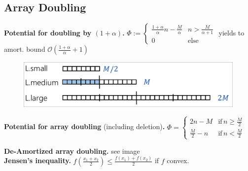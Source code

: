 \documentclass[]{article}
\newcommand\compactsubsection[1]        {\vspace{-10pt}\subsection{#1}\vspace{-5pt}}
\theoremstyle{definition}
\newcommand\oc    {\mathcal{O}}
\newcommand\other {\mathrm{else}}
\newcommand\ag        {\alpha}
\newcommand\cl [1]    {\left ( #1 \right )}
\begin{document}
\begin{multicols}{4}
		
		\compactsubsection{Array Doubling}
			\textbf{Potential for doubling by $(1 + \ag)$. }$\Phi := \begin{cases}
				\frac{1 + \ag}{\ag} n - \frac{M}{\ag} & \!n > \frac{M}{\ag + 1} \\
				0 & \!\other
			\end{cases}$
			\!\!yields to amort. bound $\oc\cl{\frac{1 + \ag}{\ag} + 1}$ \\
			\begin{figure}
				\includegraphics[width=\linewidth]{images/deAmoritzedArray}
				\vspace{-20pt}
			\end{figure}
			\textbf{Potential for array doubling} (including deletion)\textbf{. }$\Phi = \begin{cases}
				2n - M & \text{if}\, n \ge \frac{M}{2} \\
				\frac{M}{2} - n & \text{if}\, n < \frac{M}{2}
			\end{cases}$
			
			\textbf{De-Amortized array doubling. }see image \\
			\textbf{Jensen's inequality. }$\textstyle f(\frac{x_1 + x_2}{2}) \le \frac{f(x_1) + f(x_2)}{2}$ if $f$ convex. 
		
		
	\end{multicols}
	
\end{document}
